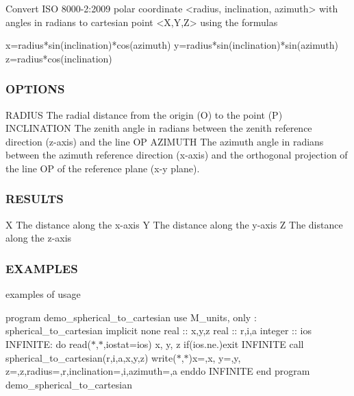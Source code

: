 \begin{DoxyVerb} Convert ISO 8000-2:2009 polar coordinate <radius, inclination, azimuth> with
 angles in radians to cartesian point <X,Y,Z> using the formulas

   x=radius*sin(inclination)*cos(azimuth)
   y=radius*sin(inclination)*sin(azimuth)
   z=radius*cos(inclination)
\end{DoxyVerb}


\subsubsection*{O\+P\+T\+I\+O\+NS}

\begin{DoxyVerb}RADIUS       The radial distance from the origin (O) to the point (P)
INCLINATION  The zenith angle in radians between the zenith reference direction
             (z-axis) and the line OP
AZIMUTH      The azimuth angle in radians between the azimuth reference direction
             (x-axis) and the orthogonal projection of the line OP of the
             reference plane (x-y plane).
\end{DoxyVerb}


\subsubsection*{R\+E\+S\+U\+L\+TS}

\begin{DoxyVerb}X  The distance along the x-axis
Y  The distance along the y-axis
Z  The distance along the z-axis
\end{DoxyVerb}


\subsubsection*{E\+X\+A\+M\+P\+L\+ES}

examples of usage

program demo\+\_\+spherical\+\_\+to\+\_\+cartesian use M\+\_\+units, only \+: spherical\+\_\+to\+\_\+cartesian implicit none real \+:\+: x,y,z real \+:\+: r,i,a integer \+:\+: ios I\+N\+F\+I\+N\+I\+TE\+: do read($\ast$,$\ast$,iostat=ios) x, y, z if(ios.\+ne.)exit I\+N\+F\+I\+N\+I\+TE call spherical\+\_\+to\+\_\+cartesian(r,i,a,x,y,z) write($\ast$,$\ast$)\textquotesingle{}x=\textquotesingle{},x,\textquotesingle{} y=\textquotesingle{},y,\textquotesingle{} z=\textquotesingle{},z,\textquotesingle{}radius=\textquotesingle{},r,\textquotesingle{}inclination=\textquotesingle{},i,\textquotesingle{}azimuth=\textquotesingle{},a enddo I\+N\+F\+I\+N\+I\+TE end program demo\+\_\+spherical\+\_\+to\+\_\+cartesian \mbox{\label{namespacem__units_ad6861fff0b83942a7e6b35a274bf2e09}} 

